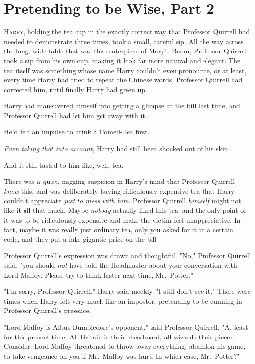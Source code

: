 \chapter{Pretending to be Wise, Part 2}

\lettrine{H}{arry}, holding
the tea cup in the exactly correct way that Professor Quirrell had needed to
demonstrate three times, took a small, careful sip. All the way across the
long, wide table that was the centerpiece of Mary's Room, Professor Quirrell
took a sip from his own cup, making it look far more natural and elegant. The
tea itself was something whose name Harry couldn't even pronounce, or at least,
every time Harry had tried to repeat the Chinese words, Professor Quirrell had
corrected him, until finally Harry had given up.

Harry had maneuvered himself into getting a glimpse at the bill last time, and
Professor Quirrell had let him get away with it.

He'd felt an impulse to drink a Comed-Tea first.

\emph{Even taking that into account}, Harry had still been shocked out of his
skin.

And it still tasted to him like, well, tea.

There was a quiet, nagging suspicion in Harry's mind that Professor Quirrell
\emph{knew} this, and was deliberately buying ridiculously expensive tea that
Harry couldn't appreciate \emph{just to mess with him.} Professor Quirrell
\emph{himself} might not like it all that much. Maybe \emph{nobody} actually
liked this tea, and the only point of it was to be ridiculously expensive and
make the victim feel unappreciative. In fact, maybe it was really just ordinary
tea, only you asked for it in a certain code, and they put a fake gigantic
price on the bill{\el}

Professor Quirrell's expression was drawn and thoughtful. "No," Professor
Quirrell said, "you should \emph{not} have told the Headmaster about your
conversation with Lord Malfoy. Please try to think faster next time,
Mr.~Potter."

"I'm sorry, Professor Quirrell," Harry said meekly. "I still don't see it."
There were times when Harry felt very much like an impostor, pretending to be
cunning in Professor Quirrell's presence.

"Lord Malfoy is Albus Dumbledore's opponent," said Professor Quirrell. "At
least for this present time. All Britain is their chessboard, all wizards their
pieces. Consider: Lord Malfoy threatened to throw away everything, abandon his
game, to take vengeance on you if Mr.~Malfoy was hurt. In which case,
Mr.~Potter\el?"

